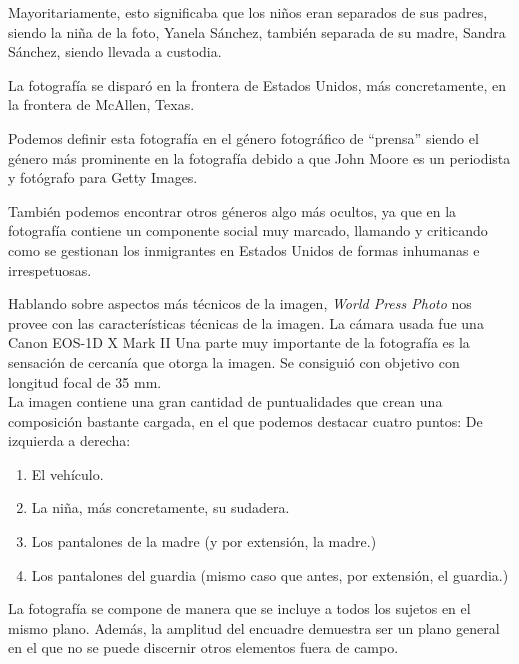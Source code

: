 \documentclass[11pt]{article}
\begin{document}
Mayoritariamente, esto significaba que los niños eran separados de sus padres, siendo la niña de la foto, Yanela Sánchez, también separada de su madre, Sandra Sánchez, siendo llevada a custodia.

La fotografía se disparó en la frontera de Estados Unidos, más concretamente, en la frontera de McAllen, Texas.\cite{einstein} \newline

Podemos definir esta fotografía en el género fotográfico de “prensa” siendo el género más prominente en la fotografía debido a que John Moore es un periodista y fotógrafo para Getty Images.

También podemos encontrar otros géneros algo más ocultos, ya que en la fotografía contiene un componente social muy marcado, llamando y criticando como se gestionan los inmigrantes en Estados Unidos de formas inhumanas e irrespetuosas.

Hablando sobre aspectos más técnicos de la imagen, \textit{World Press Photo} nos provee con las características técnicas de la imagen.
La cámara usada fue una Canon EOS-1D X Mark II
Una parte muy importante de la fotografía es la sensación de cercanía que otorga la imagen. Se consiguió con objetivo con longitud focal de 35 mm. \\


La imagen contiene una gran cantidad de puntualidades que crean una composición bastante cargada, en el que podemos destacar cuatro puntos:
De izquierda a derecha:
\begin{enumerate}
	\item El vehículo.
	\item La niña, más concretamente, su sudadera.
	\item Los pantalones de la madre (y por extensión, la madre.)
	\item Los pantalones del guardia (mismo caso que antes, por extensión, el guardia.)
\end{enumerate}

La fotografía se compone de manera que se incluye a todos los sujetos en el mismo plano. Además, la amplitud del encuadre demuestra ser un plano general en el que no se puede discernir otros elementos fuera de campo. \newline
\end{document}
